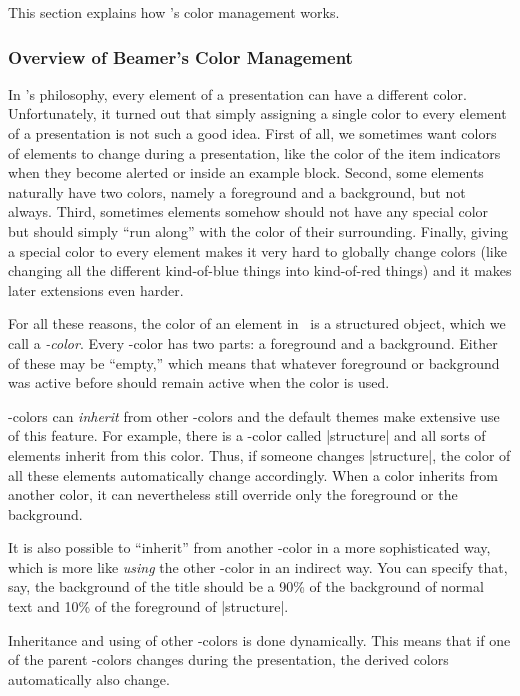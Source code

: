 This section explains how \beamer's color management works.

\subsubsection{Overview of Beamer's Color Management}

In \beamer's philosophy, every element of a presentation can have a different color. Unfortunately, it turned out that simply assigning a single color to every element of a presentation is not such a good idea. First of all, we sometimes want colors of elements to change during a presentation, like the color of the item indicators when they become alerted or inside an example block. Second, some elements naturally have two colors, namely a foreground and a background, but not always. Third, sometimes elements somehow should not have any special color but should simply ``run along'' with the color of their surrounding. Finally, giving a special color to every element makes it very hard to globally change colors (like changing all the different kind-of-blue things into kind-of-red things) and it makes later extensions even harder.

For all these reasons, the color of an element in \beamer\ is a structured object, which we call a \emph{\beamer-color}. Every \beamer-color has two parts: a foreground and a background. Either of these may be ``empty,'' which means that whatever foreground or background was active before should remain active when the color is used.

\beamer-colors can \emph{inherit} from other \beamer-colors and the default themes make extensive use of this feature. For example, there is a \beamer-color called |structure| and all sorts of elements inherit from this color. Thus, if someone changes |structure|, the color of all these elements automatically change accordingly. When a color inherits from another color, it can nevertheless still override only the foreground or the background.

It is also possible to ``inherit'' from another \beamer-color in a more sophisticated way, which is more like \emph{using} the other \beamer-color in an indirect way. You can specify that, say, the background of the title should be a 90\% of the background of normal text and 10\% of the foreground of |structure|.

Inheritance and using of other \beamer-colors is done dynamically. This means that if one of the parent \beamer-colors changes during the presentation, the derived colors automatically also change.

